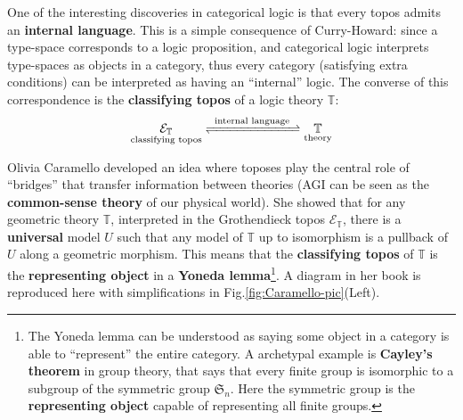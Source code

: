 \documentclass[runningheads]{llncs}
\begin{document}
One of the interesting discoveries in categorical logic is that every topos admits an \textbf{internal language}.  This is a simple consequence of Curry-Howard: since a type-space corresponds to a logic proposition, and categorical logic interprets type-spaces as objects in a category, thus every category (satisfying extra conditions) can be interpreted as having an ``internal'' logic.  The converse of this correspondence is the \textbf{classifying topos} of a logic theory $\mathbb{T}$:
\begin{equation}
\underset{\footnotesize\text{classifying topos}}{\mathcal{E}_\mathbb{T}} \xrightleftharpoons[]{\; \text{ internal language } \;} \underset{\footnotesize\text{theory}}{\mathbb{T}}
\end{equation}

Olivia Caramello \cite{Caramello2018} developed an idea where toposes play the central role of ``bridges'' that transfer information between theories (AGI can be seen as the \textbf{common-sense theory} of our physical world).  She showed that for any geometric theory $\mathbb{T}$, interpreted in the Grothendieck topos $\mathcal{E}_\mathbb{T}$, there is a \textbf{universal} model $U$ such that any model of $\mathbb{T}$ up to isomorphism is a pullback of $U$ along a geometric morphism.  This means that the \textbf{classifying topos} of $\mathbb{T}$ is the \textbf{representing object} in a \textbf{Yoneda lemma}\footnote{The Yoneda lemma can be understood as saying some object in a category is able to ``represent'' the entire category.  A archetypal example is \textbf{Cayley's theorem} in group theory, that says that every finite group is isomorphic to a subgroup of the symmetric group $\mathfrak{S}_n$. Here the symmetric group is the \textbf{representing object} capable of representing all finite groups.}.  A diagram in her book is reproduced here with simplifications in Fig.\ref{fig:Caramello-pic}(Left).
\end{document}
